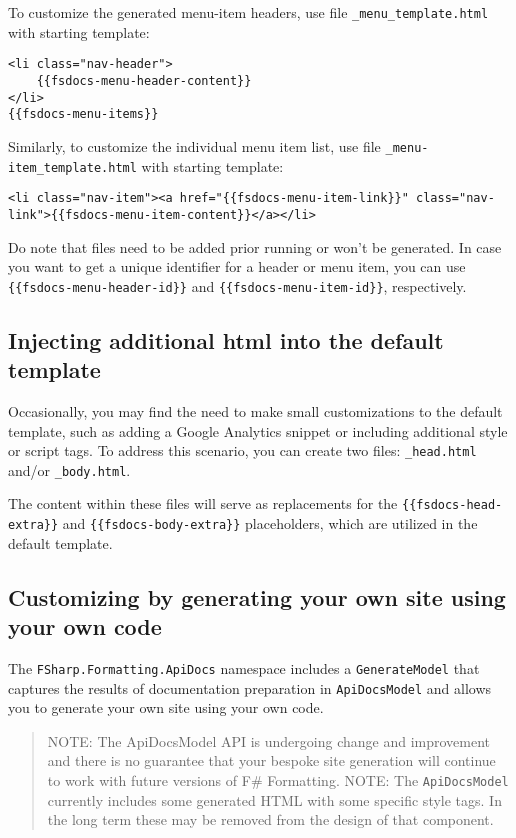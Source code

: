\documentclass{article}
\begin{document}
To customize the generated menu-item headers, use file \texttt{\_menu\_template.html} with starting template:
\begin{lstlisting}
<li class="nav-header">
    {{fsdocs-menu-header-content}}
</li>
{{fsdocs-menu-items}}

\end{lstlisting}


Similarly, to customize the individual menu item list, use file \texttt{\_menu-item\_template.html} with starting template:
\begin{lstlisting}
<li class="nav-item"><a href="{{fsdocs-menu-item-link}}" class="nav-link">{{fsdocs-menu-item-content}}</a></li>

\end{lstlisting}


Do note that files need to be added prior running or won't be generated.
In case you want to get a unique identifier for a header or menu item, you can use \texttt{\{\{fsdocs-menu-header-id\}\}}
and \texttt{\{\{fsdocs-menu-item-id\}\}}, respectively.
\subsection*{Injecting additional html into the default template}



Occasionally, you may find the need to make small customizations to the default template, such as adding a Google
Analytics snippet or including additional style or script tags. To address this scenario, you can create two
files: \texttt{\_head.html} and/or \texttt{\_body.html}.


The content within these files will serve as replacements for the \texttt{\{\{fsdocs-head-extra\}\}} and \texttt{\{\{fsdocs-body-extra\}\}}
placeholders, which are utilized in the default template.
\subsection*{Customizing by generating your own site using your own code}



The \texttt{FSharp.Formatting.ApiDocs} namespace includes a \texttt{GenerateModel} that captures
the results of documentation preparation in \texttt{ApiDocsModel} and allows you to
generate your own site using your own code.
\begin{quote}


NOTE: The ApiDocsModel API is undergoing change and improvement and there is no guarantee that your bespoke site
generation will continue to work
with future versions of F\# Formatting.
NOTE: The \texttt{ApiDocsModel} currently includes some generated HTML with some specific style tags.
In the long term these may be removed from the design of that component.
\end{quote}
\end{document}

